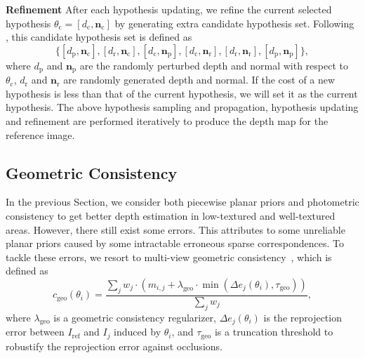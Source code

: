 \documentclass[letterpaper]{article} %
\begin{document}
\noindent\textbf{Refinement} After each hypothesis updating, we refine the current selected hypothesis $\theta_{\text{c}}=[d_\text{c},\boldsymbol{n}_\text{c}]$ by generating extra candidate hypothesis set. Following \cite{Schonberger2016Pixelwise,Xu2018Multi}, this candidate hypothesis set is defined as  
\begin{equation}\label{eq:12}
\{[d_\text{p},\boldsymbol{n}_\text{c}],[d_\text{r},\boldsymbol{n}_\text{c}],[d_\text{c},\boldsymbol{n}_\text{p}],[d_\text{c},\boldsymbol{n}_\text{r}],[d_\text{r},\boldsymbol{n}_\text{r}],[d_\text{p},\boldsymbol{n}_\text{p}]\},
\end{equation}
where $d_\text{p}$ and $\boldsymbol{n}_\text{p}$ are the randomly perturbed depth and normal with respect to $\theta_\text{c}$, $d_\text{r}$ and $\boldsymbol{n}_\text{r}$ are randomly generated depth and normal. If the cost of a new hypothesis is less than that of the current hypothesis, we will set it as the current hypothesis. The above hypothesis sampling and propagation, hypothesis updating and refinement are performed iteratively to produce the depth map for the reference image.   

\subsection{Geometric Consistency}

In the previous Section, we consider both piecewise planar priors and photometric consistency to get better depth estimation in low-textured and well-textured areas. However, there still exist some errors. This attributes to some unreliable planar priors caused by some intractable erroneous sparse correspondences. To tackle these errors, we resort to multi-view geometric consistency~\cite{Schonberger2016Pixelwise,Xu2018Multi}, %
which is defined as
\begin{equation}\label{eq:13}
c_\text{geo}(\theta_{i})=\frac{\sum_{j}w_{j}\cdot (m_{i,j}+\lambda_\text{geo}\cdot \displaystyle\mathop{\min}(\Delta e_{j}(\theta_{i}),\tau_\text{geo}))}{\sum_{j}w_{j}},
\end{equation} 
where $\lambda_\text{geo}$ is a geometric consistency regularizer, $\Delta{e}_{j}(\theta_{i})$ is the reprojection error between $I_\text{ref}$ and $I_{j}$ induced by $\theta_{i}$, and $\tau_\text{geo}$ is a truncation threshold to robustify the reprojection error against occlusions.
\end{document}
